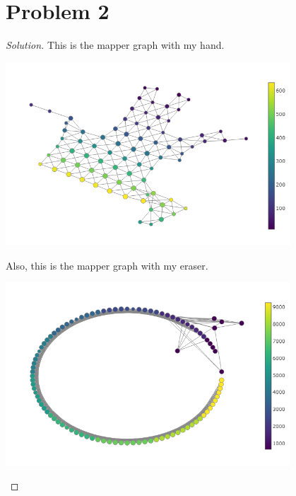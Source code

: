 \section*{Problem 2}
	\begin{proof} [Solution]
		This is the mapper graph with my hand.
		\begin{center}
			\includegraphics[width=0.8\textwidth]{hand.png}
		\end{center}
		Also, this is the mapper graph with my eraser.
		\begin{center}
			\includegraphics[width=0.8\textwidth]{eraser.png}
		\end{center}
	\end{proof}